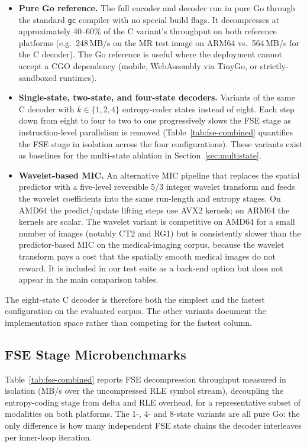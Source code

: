 \documentclass[journal]{IEEEtran}
\begin{document}
\begin{itemize}
  \item \textbf{Pure Go reference.} The full encoder and decoder run in
  pure Go through the standard \texttt{gc} compiler with no special build
  flags. It decompresses at approximately 40--60\% of the C variant's
  throughput on both reference platforms (e.g.\ 248\,MB/s on the MR test
  image on ARM64 vs.\ 564\,MB/s for the C decoder). The Go reference is
  useful where the deployment cannot accept a CGO dependency (mobile,
  WebAssembly via TinyGo, or strictly-sandboxed runtimes).
  \item \textbf{Single-state, two-state, and four-state decoders.}
  Variants of the same C decoder with $k\in\{1,2,4\}$ entropy-coder
  states instead of eight. Each step down from eight to four to two to
  one progressively slows the FSE stage as instruction-level parallelism
  is removed (Table~\ref{tab:fse-combined} quantifies the FSE stage in
  isolation across the four configurations). These variants exist as
  baselines for the multi-state ablation in
  Section~\ref{sec:multistate}.
  \item \textbf{Wavelet-based MIC.} An alternative MIC pipeline that
  replaces the spatial predictor with a five-level reversible 5/3 integer
  wavelet transform and feeds the wavelet coefficients into the same
  run-length and entropy stages. On AMD64 the predict/update lifting
  steps use AVX2 kernels; on ARM64 the kernels are scalar. The
  wavelet variant is competitive on AMD64 for a small number of images
  (notably CT2 and RG1) but is consistently slower than the
  predictor-based MIC on the medical-imaging corpus, because the wavelet
  transform pays a cost that the spatially smooth medical images do not
  reward. It is included in our test suite as a back-end option but does
  not appear in the main comparison tables.
\end{itemize}

The eight-state C decoder is therefore both the simplest and the fastest
configuration on the evaluated corpus. The other variants document the
implementation space rather than competing for the fastest column.

\subsection{FSE Stage Microbenchmarks}

Table~\ref{tab:fse-combined} reports FSE decompression throughput measured in
isolation (MB/s over the uncompressed RLE symbol stream), decoupling the
entropy-coding stage from delta and RLE overhead, for a representative subset
of modalities on both platforms. The 1-, 4- and 8-state variants are all
pure Go: the only difference is how many independent FSE state chains the
decoder interleaves per inner-loop iteration.
\end{document}

